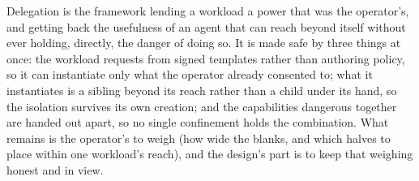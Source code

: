 Delegation is the framework lending a workload a power that was the
operator's, and getting back the usefulness of an agent that can reach
beyond itself without ever holding, directly, the danger of doing so. It
is made safe by three things at once: the workload requests from signed
templates rather than authoring policy, so it can instantiate only what
the operator already consented to; what it instantiates is a sibling
beyond its reach rather than a child under its hand, so the isolation
survives its own creation; and the capabilities dangerous together are
handed out apart, so no single confinement holds the combination. What
remains is the operator's to weigh (how wide the blanks, and which
halves to place within one workload's reach), and the design's part is
to keep that weighing honest and in view.

